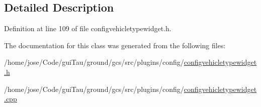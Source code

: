 \subsection{Detailed Description}


Definition at line 109 of file configvehicletypewidget.\-h.



The documentation for this class was generated from the following files\-:\begin{DoxyCompactItemize}
\item 
/home/jose/\-Code/gui\-Tau/ground/gcs/src/plugins/config/\hyperlink{configvehicletypewidget_8h}{configvehicletypewidget.\-h}\item 
/home/jose/\-Code/gui\-Tau/ground/gcs/src/plugins/config/\hyperlink{configvehicletypewidget_8cpp}{configvehicletypewidget.\-cpp}\end{DoxyCompactItemize}
